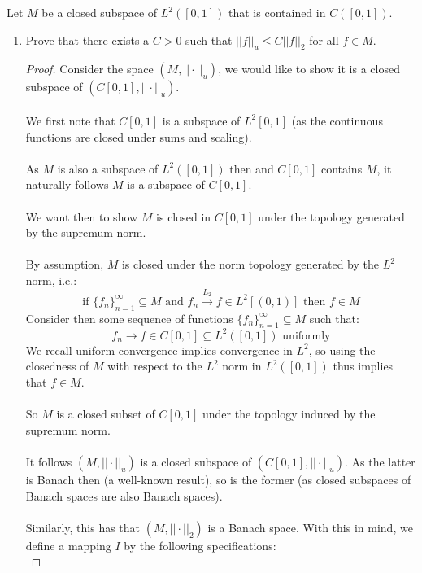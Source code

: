 \documentclass[12pt]{article}
\newenvironment{ex}[2][Exercise]{\begin{trivlist}
\item[\hskip \labelsep {\bfseries #1}\hskip \labelsep {\bfseries #2.}]}{\end{trivlist}}
\begin{document}
\begin{ex}{12}
    Let $M$ be a closed subspace of $L^2([0,1])$ that is contained in $C([0,1])$. 
    \begin{enumerate}[label=(\alph*)]
        \item Prove that there exists a $C > 0$ such that $||f||_u \leq C||f||_2$ for all $f \in M$.
        \begin{proof}
            Consider the space $(M, ||\cdot||_u)$, we would like to show it is a closed subspace of $(C[0,1], ||\cdot||_u)$. \\ \\
            We first note that $C[0,1]$ is a subspace of $L^2{[0,1]}$ (as the continuous functions are closed under sums and scaling). \\ \\
            As $M$ is also a subspace of $L^2([0,1])$ then and $C[0,1]$ contains $M$, it naturally follows $M$ is a subspace of $C[0,1]$.
            \\ \\We want then to show $M$ is closed in $C[0,1]$ under the topology generated by the supremum norm. \\ \\
            By assumption, $M$ is closed under the norm topology generated by the $L^2$ norm, i.e.: $$\text{if } \{f_n\}_{n = 1}^\infty \subseteq M \text{ and } f_n \xrightarrow{L_2} f \in L^2[(0,1)] \text{ then } f \in M$$
            Consider then some sequence of functions $\{f_n\}_{n = 1}^\infty \subseteq M$ such that: $$f_n \rightarrow f \in C[0,1] \subseteq L^2([0,1]) \text{ uniformly}$$
            We recall uniform convergence implies convergence in $L^2$, so using the closedness of $M$ with respect to the $L^2$ norm in $L^2([0,1])$ thus implies that $f \in M$. \\ \\
            So $M$ is a closed subset of $C[0,1]$ under the topology induced by the supremum norm. \\ \\
            It follows $(M, ||\cdot||_u)$ is a closed subspace of $(C[0,1], ||\cdot||_u)$. As the latter is Banach then (a well-known result), so is the former (as closed subspaces of Banach spaces are also Banach spaces). \\ \\
            Similarly, this has that $(M, ||\cdot||_2)$ is a Banach space. With this in mind, we define a mapping $I$ by the following specifications:
            \begin{equation}

\end{equation}
\end{proof}
\end{enumerate}
\end{ex}
\end{document}
